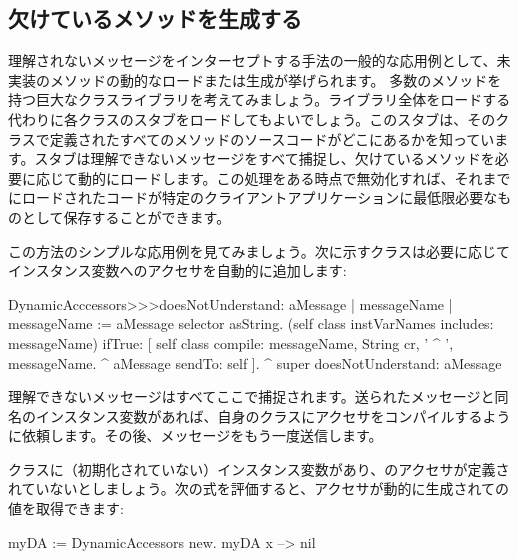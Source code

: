 \documentclass[a4paper,10pt,twoside]{book}
\begin{document}
\subsection{欠けているメソッドを生成する}

理解されないメッセージをインターセプトする手法の一般的な応用例として、未実装のメソッドの動的なロードまたは生成が挙げられます。
多数のメソッドを持つ巨大なクラスライブラリを考えてみましょう。ライブラリ全体をロードする代わりに各クラスのスタブをロードしてもよいでしょう。このスタブは、そのクラスで定義されたすべてのメソッドのソースコードがどこにあるかを知っています。スタブは理解できないメッセージをすべて捕捉し、欠けているメソッドを必要に応じて動的にロードします。この処理をある時点で無効化すれば、それまでにロードされたコードが特定のクライアントアプリケーションに最低限必要なものとして保存することができます。


この方法のシンプルな応用例を見てみましょう。次に示すクラスは必要に応じてインスタンス変数へのアクセサを自動的に追加します:

\begin{code}{}
DynamicAcccessors>>>doesNotUnderstand: aMessage
	| messageName |
	messageName := aMessage selector asString.
	(self class instVarNames includes: messageName)
		ifTrue: [
			self class compile: messageName, String cr, ' ^ ', messageName.
			^ aMessage sendTo: self ].
	^ super doesNotUnderstand: aMessage
\end{code}
理解できないメッセージはすべてここで捕捉されます。送られたメッセージと同名のインスタンス変数があれば、自身のクラスにアクセサをコンパイルするように依頼します。その後、メッセージをもう一度送信します。

クラスに（初期化されていない）インスタンス変数があり、のアクセサが定義されていないとしましょう。次の式を評価すると、アクセサが動的に生成されての値を取得できます:
\begin{code}{}
myDA := DynamicAccessors new.
myDA x --> nil
\end{code}
\end{document}
